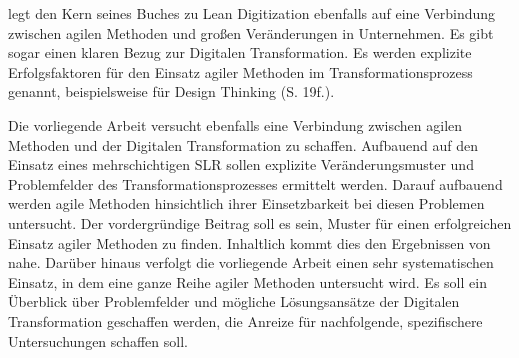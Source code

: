  legt den Kern seines Buches zu Lean Digitization ebenfalls auf eine Verbindung zwischen agilen Methoden und großen Veränderungen in Unternehmen. Es gibt sogar einen klaren Bezug zur Digitalen Transformation. Es werden explizite Erfolgsfaktoren für den Einsatz agiler Methoden im Transformationsprozess genannt, beispielsweise für Design Thinking (S. 19f.). 

Die vorliegende Arbeit versucht ebenfalls eine Verbindung zwischen agilen Methoden und der Digitalen Transformation zu schaffen. Aufbauend auf den Einsatz eines mehrschichtigen SLR sollen explizite Veränderungsmuster und Problemfelder des Transformationsprozesses ermittelt werden. Darauf aufbauend werden agile Methoden hinsichtlich ihrer Einsetzbarkeit bei diesen Problemen untersucht. Der vordergründige Beitrag soll es sein, Muster für einen erfolgreichen Einsatz agiler Methoden zu finden. Inhaltlich kommt dies den Ergebnissen von  nahe. Darüber hinaus verfolgt die vorliegende Arbeit einen sehr systematischen Einsatz, in dem eine ganze Reihe agiler Methoden untersucht wird. Es soll ein Überblick über Problemfelder und mögliche Lösungsansätze der Digitalen Transformation geschaffen werden, die Anreize für nachfolgende, spezifischere Untersuchungen schaffen soll.
